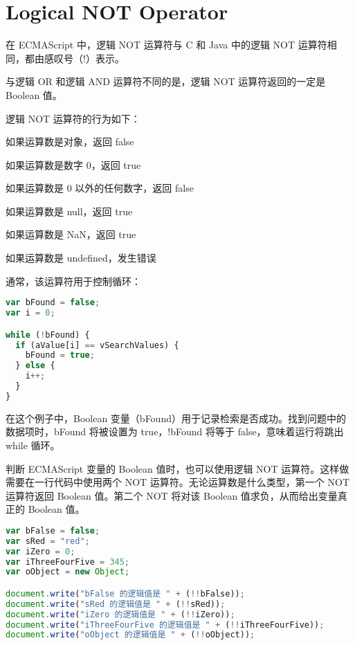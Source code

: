 \section{Logical NOT Operator}

在 ECMAScript 中，逻辑 NOT 运算符与 C 和 Java 中的逻辑 NOT 运算符相同，都由感叹号（!）表示。

与逻辑 OR 和逻辑 AND 运算符不同的是，逻辑 NOT 运算符返回的一定是 Boolean 值。

逻辑 NOT 运算符的行为如下：

\begin{compactitem}
\item 如果运算数是对象，返回 false
\item 如果运算数是数字 0，返回 true
\item 如果运算数是 0 以外的任何数字，返回 false
\item 如果运算数是 null，返回 true
\item 如果运算数是 NaN，返回 true
\item 如果运算数是 undefined，发生错误
\end{compactitem}


通常，该运算符用于控制循环：

\begin{lstlisting}[language=JavaScript]
var bFound = false;
var i = 0;

while (!bFound) {
  if (aValue[i] == vSearchValues) {
    bFound = true;
  } else {
    i++;
  }
}
\end{lstlisting}

在这个例子中，Boolean 变量（bFound）用于记录检索是否成功。找到问题中的数据项时，bFound 将被设置为 true，!bFound 将等于 false，意味着运行将跳出 while 循环。


判断 ECMAScript 变量的 Boolean 值时，也可以使用逻辑 NOT 运算符。这样做需要在一行代码中使用两个 NOT 运算符。无论运算数是什么类型，第一个 NOT 运算符返回 Boolean 值。第二个 NOT 将对该 Boolean 值求负，从而给出变量真正的 Boolean 值。

\begin{lstlisting}[language=JavaScript]
var bFalse = false;
var sRed = "red";
var iZero = 0;
var iThreeFourFive = 345;
var oObject = new Object;

document.write("bFalse 的逻辑值是 " + (!!bFalse));
document.write("sRed 的逻辑值是 " + (!!sRed));
document.write("iZero 的逻辑值是 " + (!!iZero));
document.write("iThreeFourFive 的逻辑值是 " + (!!iThreeFourFive));
document.write("oObject 的逻辑值是 " + (!!oObject));
\end{lstlisting}


